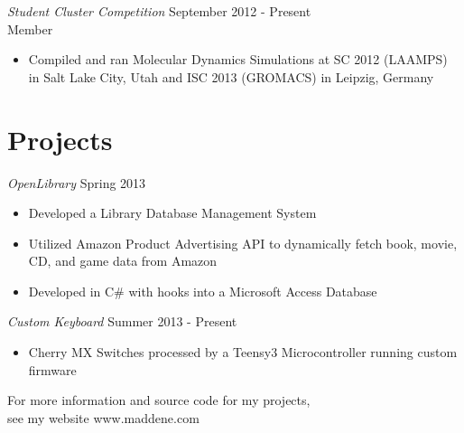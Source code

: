 \documentclass[line,margin]{res}
\newenvironment{tightcenter}{%
  \setlength\topsep{0pt}
  \setlength\parskip{0pt}
  \begin{center}
}{%
  \end{center}
}
\begin{document}
\begin{resume}
        {\sl Student Cluster Competition} \hfill September 2012 - Present \\
                Member
                \begin{itemize}  \itemsep -2pt %
                  \item Compiled and ran Molecular Dynamics Simulations at SC 2012 (LAAMPS) in Salt Lake City, Utah and ISC 2013 (GROMACS) in Leipzig, Germany
                \end{itemize}
                
\section{\textcolor{TealBlue}{Projects}}
				{\sl OpenLibrary} \hfill Spring 2013
                \begin{itemize}  \itemsep -2pt %
                  \item Developed a Library Database Management System
                  \item Utilized Amazon Product Advertising API to dynamically fetch book, movie, CD, and game data from Amazon
                  \item Developed in C\# with hooks into a Microsoft Access Database
                \end{itemize}
                
                {\sl Custom Keyboard} \hfill Summer 2013 - Present
                \begin{itemize}  \itemsep -2pt %
                    \item Cherry MX Switches processed by a Teensy3 Microcontroller running custom firmware \\[2ex]
                \end{itemize}

                \begin{tightcenter}
                For more information and source code for my projects,\\
                see my website www.maddene.com
                \end{tightcenter}

\end{resume}
\end{document}
